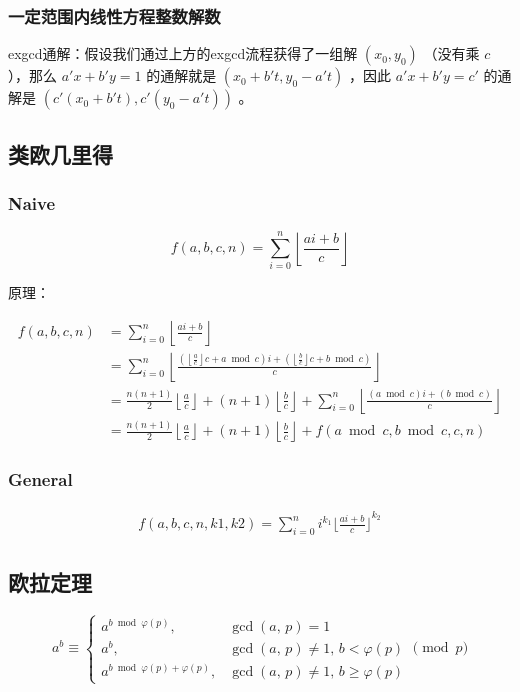 \documentclass{article}
\begin{document}
\subsubsection{一定范围内线性方程整数解数}
exgcd通解：假设我们通过上方的exgcd流程获得了一组解 $(x_0,y_0)$ （没有乘 $c$ ），那么 $a'x+b'y=1$ 的通解就是 $(x_0+b't,y_0-a't)$ ，因此 $a'x+b'y=c'$ 的通解是 $(c'(x_0+b't),c'(y_0-a't))$ 。

\subsection{类欧几里得}
\subsubsection{Naive}
$$
f(a,b,c,n)=\sum_{i=0}^n\left\lfloor \frac{ai+b}{c} \right\rfloor
$$

原理：

$$
\begin{aligned}
f(a,b,c,n)&=\sum_{i=0}^n\left\lfloor \frac{ai+b}{c} \right\rfloor\\
&=\sum_{i=0}^n\left\lfloor
\frac{\left(\left\lfloor\frac{a}{c}\right\rfloor c+a\bmod c\right)i+\left(\left\lfloor\frac{b}{c}\right\rfloor c+b\bmod c\right)}{c}\right\rfloor\\
&=\frac{n(n+1)}{2}\left\lfloor\frac{a}{c}\right\rfloor+(n+1)\left\lfloor\frac{b}{c}\right\rfloor+
\sum_{i=0}^n\left\lfloor\frac{\left(a\bmod c\right)i+\left(b\bmod c\right)}{c}
\right\rfloor\\
&=\frac{n(n+1)}{2}\left\lfloor\frac{a}{c}\right\rfloor
+(n+1)\left\lfloor\frac{b}{c}\right\rfloor+f(a\bmod c,b\bmod c,c,n)
\end{aligned}
$$

\subsubsection{General}
$$
\begin{aligned}
f(a,b,c,n,k1,k2)=\sum_{i=0}^{n}i^{k_1}{\lfloor \frac{ai+b}{c} \rfloor}^{k_2}
\end{aligned}
$$

\subsection{欧拉定理}

$$
a^b\equiv
\begin{cases}
a^{b\bmod\varphi(p)},\,&\gcd(a,\,p)=1\\
a^b,&\gcd(a,\,p)\ne1,\,b<\varphi(p)\\
a^{b\bmod\varphi(p)+\varphi(p)},&\gcd(a,\,p)\ne1,\,b\ge\varphi(p)
\end{cases}
\pmod p
$$
\end{document}
